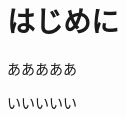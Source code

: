 \documentclass[uplatex]{jsarticle}
\begin{document}

\vspace{3mm}
\setcounter{page}{1}

\section{はじめに}
あああああ\cite{test}
\par
いいいいい



\end{document}
